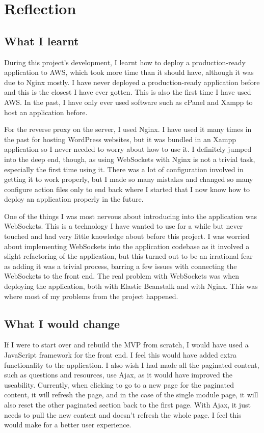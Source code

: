 \chapter{Reflection}

\section{What I learnt}

During this project's development, I learnt how to deploy a production-ready application to AWS, which took more time than it should have, although it was due to Nginx mostly. I have never deployed a production-ready application before and this is the closest I have ever gotten. This is also the first time I have used AWS. In the past, I have only ever used software such as cPanel and Xampp to host an application before.

For the reverse proxy on the server, I used Nginx. I have used it many times in the past for hosting WordPress websites, but it was bundled in an Xampp application so I never needed to worry about how to use it. I definitely jumped into the deep end, though, as using WebSockets with Nginx is not a trivial task, especially the first time using it. There was a lot of configuration involved in getting it to work properly, but I made so many mistakes and changed so many configure action files only to end back where I started that I now know how to deploy an application properly in the future. 

One of the things I was most nervous about introducing into the application was WebSockets. This is a technology I have wanted to use for a while but never touched and had very little knowledge about before this project. I was worried about implementing WebSockets into the application codebase as it involved a slight refactoring of the application, but this turned out to be an irrational fear as adding it was a trivial process, barring a few issues with connecting the WebSockets to the front end. The real problem with WebSockets was when deploying the application, both with Elastic Beanstalk and with Nginx. This was where most of my problems from the project happened. 

\section{What I would change}
If I were to start over and rebuild the MVP from scratch, I would have used a JavaScript framework for the front end. I feel this would have added extra functionality to the application. I also wish I had made all the paginated content, such as questions and resources, use Ajax, as it would have improved the useability. Currently, when clicking to go to a new page for the paginated content, it will refresh the page, and in the case of the single module page, it will also reset the other paginated section back to the first page. With Ajax, it just needs to pull the new content and doesn't refresh the whole page. I feel this would make for a better user experience.

